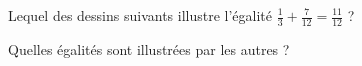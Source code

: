 
\begin{exercice}\label{exosmath-0844}

    Lequel des dessins suivants illustre l'égalité \( \frac{ 1 }{ 3 }+\frac{ 7 }{ 12 }=\frac{ 11 }{ 12 }\) ?

\begin{center}
   
   
   
\end{center}
Quelles égalités sont illustrées par les autres ?

\end{exercice}
